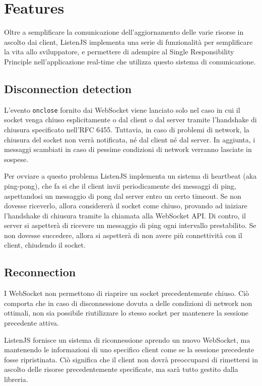 \documentclass[12pt,a4paper,openright,twoside]{report}
\begin{document}
\section{Features}\label{sec_features}
Oltre a semplificare la comunicazione dell'aggiornamento delle varie risorse in ascolto dai client, ListenJS implementa una serie di funzionalità per semplificare la vita allo sviluppatore, e permettere di adempire al Single Responsibility Principle\cite{single_responsibility_principle} nell'applicazione real-time che utilizza questo sistema di comunicazione.
\subsection{Disconnection detection}
L'evento \lstinline{onclose} fornito dai WebSocket viene lanciato solo nel caso in cui il socket venga chiuso esplicitamente o dal client o dal server tramite l'handshake di chiusura specificato nell'RFC 6455. Tuttavia, in caso di problemi di network, la chiusura del socket non verrà notificata, né dal client né dal server. In aggiunta, i messaggi scambiati in caso di pessime condizioni di network verranno lasciate in sospese.

\bigskip

Per ovviare a questo problema ListenJS implementa un sistema di heartbeat (aka ping-pong), che fa si che il client invii periodicamente dei messaggi di ping, aspettandosi un messaggio di pong dal server entro un certo timeout. Se non dovesse riceverlo, allora considererà il socket come chiuso, provando ad iniziare l'handshake di chiusura tramite la chiamata alla WebSocket API. Di contro, il server si aspetterà di ricevere un messaggio di ping ogni intervallo prestabilito. Se non dovesse succedere, allora si aspetterà di non avere più connettività con il client, chiudendo il socket.
\subsection{Reconnection}
I WebSocket non permettono di riaprire un socket precedentemente chiuso. Ciò comporta che in caso di disconnessione dovuta a delle condizioni di network non ottimali, non sia possibile riutilizzare lo stesso socket per mantenere la sessione precedente attiva.

\bigskip

ListenJS fornisce un sistema di riconnessione aprendo un nuovo WebSocket, ma mantenendo le informazioni di uno specifico client come se la sessione precedente fosse ripristinata. Ciò significa che il client non dovrà preoccuparsi di rimettersi in ascolto delle risorse precedentemente specificate, ma sarà tutto gestito dalla libreria.
\end{document}
